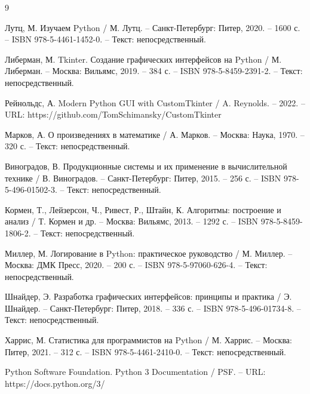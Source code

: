 
\begin{thebibliography}{9}
	
	 Лутц, М. Изучаем Python / М. Лутц. – Санкт-Петербург: Питер, 2020. – 1600 с. – ISBN 978-5-4461-1452-0. – Текст: непосредственный.
	
	 Либерман, М. Tkinter. Создание графических интерфейсов на Python / М. Либерман. – Москва: Вильямс, 2019. – 384 с. – ISBN 978-5-8459-2391-2. – Текст: непосредственный.
	
	 Рейнольдс, А. Modern Python GUI with CustomTkinter / A. Reynolds. – 2022. – URL: https://github.com/TomSchimansky/CustomTkinter
	
	 Марков, А. О произведениях в математике / А. Марков. – Москва: Наука, 1970. – 320 с. – Текст: непосредственный.
	
	 Виноградов, В. Продукционные системы и их применение в вычислительной технике / В. Виноградов. – Санкт-Петербург: Питер, 2015. – 256 с. – ISBN 978-5-496-01502-3. – Текст: непосредственный.
	
	 Кормен, Т., Лейзерсон, Ч., Ривест, Р., Штайн, К. Алгоритмы: построение и анализ / Т. Кормен и др. – Москва: Вильямс, 2013. – 1292 с. – ISBN 978-5-8459-1806-2. – Текст: непосредственный.
	
	 Миллер, М. Логирование в Python: практическое руководство / М. Миллер. – Москва: ДМК Пресс, 2020. – 200 с. – ISBN 978-5-97060-626-4. – Текст: непосредственный.
	
	 Шнайдер, Э. Разработка графических интерфейсов: принципы и практика / Э. Шнайдер. – Санкт-Петербург: Питер, 2018. – 336 с. – ISBN 978-5-496-01734-8. – Текст: непосредственный.
	
	 Харрис, М. Статистика для программистов на Python / М. Харрис. – Москва: Питер, 2021. – 312 с. – ISBN 978-5-4461-2410-0. – Текст: непосредственный.
	
	 Python Software Foundation. Python 3 Documentation / PSF. – URL: https://docs.python.org/3/
	
\end{thebibliography}
